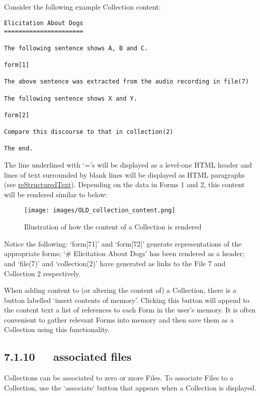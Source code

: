 \documentclass[letterpaper,10pt,english]{sphinxmanual}
\begin{document}
Consider the following example Collection content:

\begin{Verbatim}[commandchars=\\\{\}]
Elicitation About Dogs
======================

The following sentence shows A, B and C.

form[1]

The above sentence was extracted from the audio recording in file(7)

The following sentence shows X and Y.

form[2]

Compare this discourse to that in collection(2)

The end.
\end{Verbatim}

The line underlined with `='s will be displayed as a level-one HTML header
and lines of text surrounded by blank lines will be displayed as HTML paragraphs
(see {\hyperref[user_guide:restructuredtext]{reStructuredText}}).  Depending on the data in Forms 1 and 2, this content
will be rendered similar to below:
\begin{figure}[htbp]
\centering
\capstart

\texttt{[image: images/OLD\_collection\_content.png]}
\caption{Illustration of how the content of a Collection is rendered}\end{figure}

Notice the following: `form{[}71{]}' and `form{[}72{]}' generate representations of the
appropriate forms; `\# Elicitation About Dogs' has been rendered as a header; and
`file(7)' and `collection(2)' have generated as links to the File 7 and
Collection 2 respectively.

When adding content to (or altering the content of) a Collection, there is a
button labelled `insert contents of memory'.  Clicking this button will append
to the content text a list of references to each Form in the user's memory.  It
is often convenient to gather relevant Forms into memory and then save them as
a Collection using this functionality.


\subsection{7.1.10   associated files}
\label{user_guide:associated-files}
Collections can be associated to zero or more Files.  To associate Files to a
Collection, use the `associate' button that appears when a Collection is
displayed.
\end{document}

